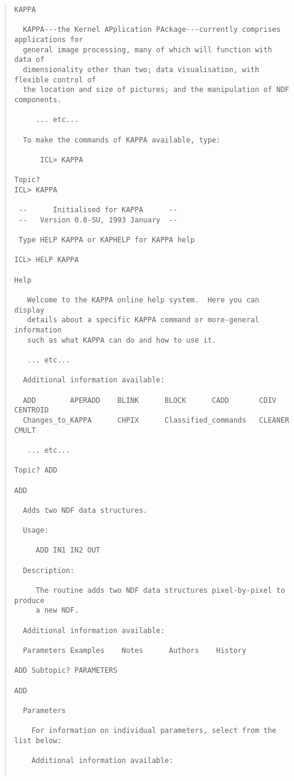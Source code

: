 \documentclass[twoside,11pt]{article}
\renewcommand{\_}{\texttt{\symbol{95}}}
\begin{document}
\begin{quote}
\begin{verbatim}
KAPPA  

  KAPPA---the Kernel APplication PAckage---currently comprises applications for
  general image processing, many of which will function with data of 
  dimensionality other than two; data visualisation, with flexible control of 
  the location and size of pictures; and the manipulation of NDF components. 

     ... etc...

  To make the commands of KAPPA available, type: 
  
      ICL> KAPPA 
  
Topic? 
ICL> KAPPA 
 
 --      Initialised for KAPPA      -- 
 --   Version 0.8-SU, 1993 January  -- 
 
 Type HELP KAPPA or KAPHELP for KAPPA help 
  
ICL> HELP KAPPA 
  
Help

   Welcome to the KAPPA online help system.  Here you can display
   details about a specific KAPPA command or more-general information
   such as what KAPPA can do and how to use it.  

   ... etc...

  Additional information available:

  ADD        APERADD    BLINK      BLOCK      CADD       CDIV       CENTROID
  Changes_to_KAPPA      CHPIX      Classified_commands   CLEANER    CMULT

   ... etc...
 
Topic? ADD 
 
ADD 
  
  Adds two NDF data structures. 
  
  Usage:

     ADD IN1 IN2 OUT

  Description: 
  
     The routine adds two NDF data structures pixel-by-pixel to produce 
     a new NDF. 
  
  Additional information available: 
  
  Parameters Examples    Notes      Authors    History 
  
ADD Subtopic? PARAMETERS
  
ADD 
  
  Parameters 
  
    For information on individual parameters, select from the list below: 
  
    Additional information available: 
  

\end{verbatim}
\end{quote}
\end{document}
